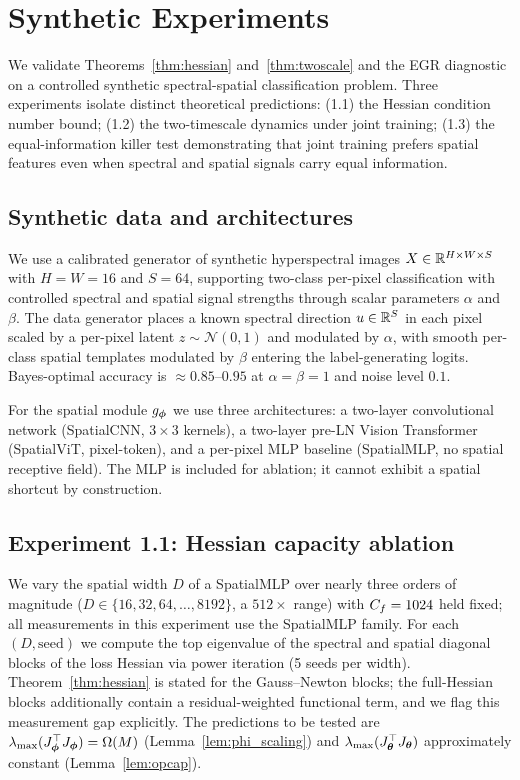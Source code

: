 \section{Synthetic Experiments}
\label{sec:experiments}

We validate Theorems~\ref{thm:hessian} and~\ref{thm:twoscale} and the
EGR diagnostic on a controlled synthetic spectral-spatial classification
problem. Three experiments isolate distinct theoretical predictions:
(1.1) the Hessian condition number bound; (1.2) the two-timescale
dynamics under joint training; (1.3) the equal-information killer
test demonstrating that joint training prefers spatial features even
when spectral and spatial signals carry equal information.

\subsection{Synthetic data and architectures}

We use a calibrated generator of synthetic hyperspectral images
$X \in \mathbb{R}^{H \times W \times S}$ with $H=W=16$ and $S=64$, supporting
two-class per-pixel classification with controlled spectral and spatial
signal strengths through scalar parameters $\alpha$ and $\beta$. The
data generator places a known spectral direction $u \in \mathbb{R}^S$ in each
pixel scaled by a per-pixel latent $z \sim \mathcal{N}(0,1)$ and
modulated by $\alpha$, with smooth per-class spatial templates
modulated by $\beta$ entering the label-generating logits.
Bayes-optimal accuracy is $\approx 0.85$--$0.95$ at $\alpha = \beta = 1$
and noise level $0.1$.

For the spatial module $g_{\boldsymbol{\phi}}$ we use three architectures: a
two-layer convolutional network (SpatialCNN, $3 \times 3$ kernels), a
two-layer pre-LN Vision Transformer (SpatialViT, pixel-token), and a
per-pixel MLP baseline (SpatialMLP, no spatial receptive field). The
MLP is included for ablation; it cannot exhibit a spatial shortcut by
construction.

\subsection{Experiment 1.1: Hessian capacity ablation}

We vary the spatial width $D$ of a SpatialMLP over nearly three
orders of magnitude ($D \in \{16, 32, 64, \ldots, 8192\}$, a
$512\times$ range) with $C_f = 1024$ held fixed; all measurements in
this experiment use the SpatialMLP family. For each
$(D, \mathrm{seed})$ we compute the top eigenvalue of the spectral
and spatial diagonal blocks of the loss Hessian via power iteration
(5 seeds per width). Theorem~\ref{thm:hessian} is stated for the
Gauss--Newton blocks; the full-Hessian blocks additionally contain a
residual-weighted functional term, and we flag this measurement gap
explicitly. The predictions to be tested are
$\lambda_{\max}(J_{\boldsymbol{\phi}}^\top J_{\boldsymbol{\phi}}) = \Omega(M)$
(Lemma~\ref{lem:phi_scaling}) and
$\lambda_{\max}(J_{\boldsymbol{\theta}}^\top J_{\boldsymbol{\theta}})$ approximately constant
(Lemma~\ref{lem:opcap}).


